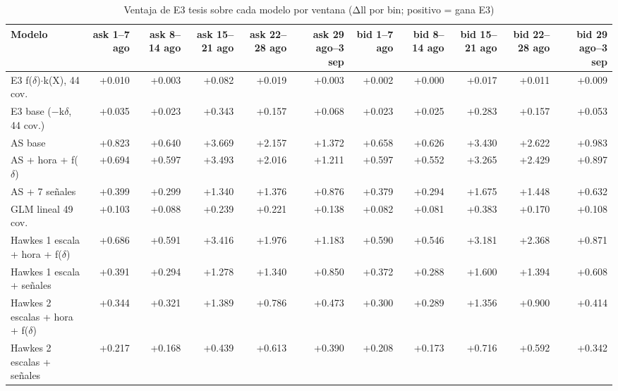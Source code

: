 \begin{table}[htbp]
\centering
\small
\caption{Ventaja de E3 tesis sobre cada modelo por ventana (Δll por bin; positivo = gana E3)}
\label{tab:T2_walkforward_por_ventana}
\begin{tabular}{lrrrrrrrrrr}
\toprule
Modelo & ask 1–7 ago & ask 8–14 ago & ask 15–21 ago & ask 22–28 ago & ask 29 ago–3 sep & bid 1–7 ago & bid 8–14 ago & bid 15–21 ago & bid 22–28 ago & bid 29 ago–3 sep \\
\midrule
E3 f($\delta$)$\cdot$k(X), 44 cov. & +0.010 & +0.003 & +0.082 & +0.019 & +0.003 & +0.002 & +0.000 & +0.017 & +0.011 & +0.009 \\
E3 base ($-$k$\delta$, 44 cov.) & +0.035 & +0.023 & +0.343 & +0.157 & +0.068 & +0.023 & +0.025 & +0.283 & +0.157 & +0.053 \\
AS base & +0.823 & +0.640 & +3.669 & +2.157 & +1.372 & +0.658 & +0.626 & +3.430 & +2.622 & +0.983 \\
AS + hora + f($\delta$) & +0.694 & +0.597 & +3.493 & +2.016 & +1.211 & +0.597 & +0.552 & +3.265 & +2.429 & +0.897 \\
AS + 7 señales & +0.399 & +0.299 & +1.340 & +1.376 & +0.876 & +0.379 & +0.294 & +1.675 & +1.448 & +0.632 \\
GLM lineal 49 cov. & +0.103 & +0.088 & +0.239 & +0.221 & +0.138 & +0.082 & +0.081 & +0.383 & +0.170 & +0.108 \\
Hawkes 1 escala + hora + f($\delta$) & +0.686 & +0.591 & +3.416 & +1.976 & +1.183 & +0.590 & +0.546 & +3.181 & +2.368 & +0.871 \\
Hawkes 1 escala + señales & +0.391 & +0.294 & +1.278 & +1.340 & +0.850 & +0.372 & +0.288 & +1.600 & +1.394 & +0.608 \\
Hawkes 2 escalas + hora + f($\delta$) & +0.344 & +0.321 & +1.389 & +0.786 & +0.473 & +0.300 & +0.289 & +1.356 & +0.900 & +0.414 \\
Hawkes 2 escalas + señales & +0.217 & +0.168 & +0.439 & +0.613 & +0.390 & +0.208 & +0.173 & +0.716 & +0.592 & +0.342 \\
\bottomrule
\end{tabular}
\end{table}
